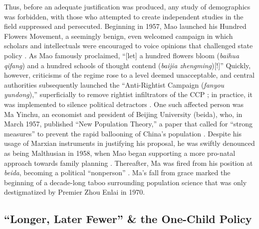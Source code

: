 Thus, before an adequate justification was produced, any study of demographics was forbidden, with those who attempted to create independent studies in the field suppressed and persecuted. Beginning in 1957, Mao launched his Hundred Flowers Movement, a seemingly benign, even welcomed campaign in which scholars and intellectuals were encouraged to voice opinions that challenged state policy \autocite[pp.\ 7--12]{WangEtAl2016AJS}. As Mao famously proclaimed, “[let] a hundred flowers bloom (\emph{baihua qifang}) and a hundred schools of thought contend (\emph{baijia zhengming})[!]” Quickly, however, criticisms of the regime rose to a level deemed unacceptable, and central authorities subsequently launched the “Anti-Rightist Campaign (\emph{fanyou yundong}),” superficially to remove rightist infiltrators of the CCP \autocite{ShaShangzhi2020}; in practice, it was implemented to silence political detractors \autocite[p.\ 3]{Vidal2016AntiRightist}. One such affected person was Ma Yinchu, an economist and president of Beijing University (beida), who, in March 1957, published “New Population Theory,” a paper that called for “strong measures” to prevent the rapid ballooning of China’s population \autocite[pp.\ 56--57]{Greenhalgh2008JustOneChild}. Despite his usage of Marxian instruments in justifying his proposal, he was swiftly denounced as being Malthusian in 1958, when Mao began supporting a more pro-natal approach towards family planning \autocite[p.\ 57]{Greenhalgh2008JustOneChild}. Thereafter, Ma was fired from his position at \emph{beida}, becoming a political “nonperson” \autocite[p.\ 687]{Tien1981DemographyInChina}. Ma’s fall from grace marked the beginning of a decade-long taboo surrounding population science that was only destigmatized by Premier Zhou Enlai in 1970. 

\subsection{``Longer, Later Fewer'' \& the One-Child Policy}

